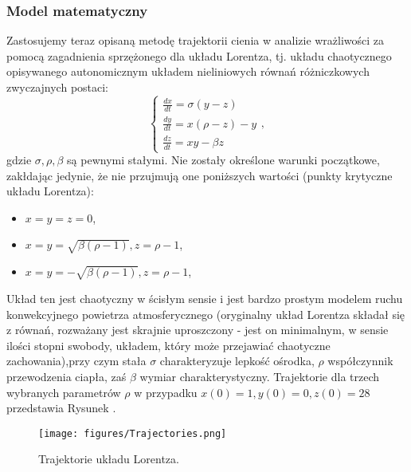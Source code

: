 \documentclass[12pt]{article}
\begin{document}
\subsubsection{Model matematyczny}
Zastosujemy teraz opisaną metodę trajektorii cienia w analizie wrażliwości za pomocą zagadnienia sprzężonego dla układu Lorentza, tj. układu chaotycznego opisywanego autonomicznym układem nieliniowych równań różniczkowych zwyczajnych postaci:
\begin{equation}
\begin{cases} 
\frac{dx}{dt} = \sigma(y-z) \\ 
\frac{dy}{dt} = x(\rho-z)-y \\ 
\frac{dz}{dt} = xy-\beta z 
\end{cases},
\label{lorenz_eq}
\end{equation}
gdzie $ \sigma, \rho, \beta $ są pewnymi stałymi. Nie zostały określone warunki początkowe, zakłdając jedynie, że nie przujmują one poniższych wartości (punkty krytyczne układu Lorentza):
\begin{itemize}
	\item $ x = y = z = 0 $,
	\item $ x = y = \sqrt{\beta(\rho - 1)}, z = \rho - 1 $,
	\item $ x = y = -\sqrt{\beta(\rho - 1)}, z = \rho - 1 $,
\end{itemize}
Układ ten jest chaotyczny w ścisłym sensie i jest bardzo prostym modelem ruchu konwekcyjnego powietrza atmosferycznego (oryginalny układ Lorentza składał się z równań, rozważany jest skrajnie uproszczony - jest on minimalnym, w sensie ilości stopni swobody, układem, który może przejawiać chaotyczne zachowania),przy czym stała   $ \sigma $ charakteryzuje lepkość ośrodka, $ \rho $ współczynnik przewodzenia ciapła, zaś $ \beta $ wymiar charakterystyczny.\newline
Trajektorie dla trzech wybranych parametrów $ \rho $ w przypadku $ x(0) = 1, y(0) = 0, z(0) = 28 $ przedstawia Rysunek .
\begin{figure}[H]
	\texttt{[image: figures/Trajectories.png]} 
	\centering
	\caption{Trajektorie układu Lorentza.}
\end{figure}
\end{document}
